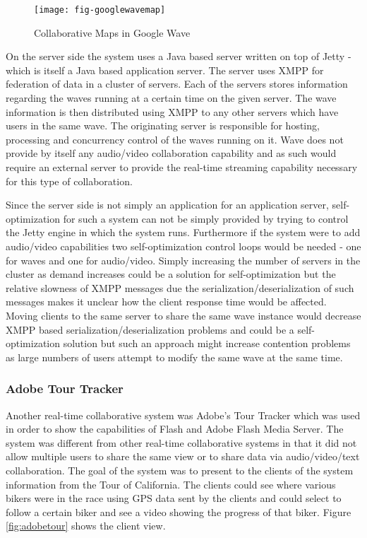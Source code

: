 \begin{figure}
	\centering
	\texttt{[image: fig-googlewavemap]}
	\caption{Collaborative Maps in Google Wave}
	\label{fig:googlewave}
\end{figure}

On the server side the system uses a Java based server written on top of Jetty - which is itself a Java based application server. The server uses XMPP for federation of data in a cluster of servers. Each of the servers stores information regarding the waves running at a certain time on the given server. The wave information is then distributed using XMPP to any other servers which have users in the same wave. The originating server is responsible for hosting, processing and concurrency control of the waves running on it. Wave does not provide by itself any audio/video collaboration capability and as such would require an external server to provide the real-time streaming capability necessary for this type of collaboration.

Since the server side is not simply an application for an application server, self-optimization for such a system can not be simply provided by trying to control the Jetty engine in which the system runs. Furthermore if the system were to add audio/video capabilities two self-optimization control loops would be needed - one for waves and one for audio/video. Simply increasing the number of servers in the cluster as demand increases could be a solution for self-optimization but the relative slowness of XMPP messages due the serialization/deserialization of such messages makes it unclear how the client response time would be affected. Moving clients to the same server to share the same wave instance would decrease XMPP based serialization/deserialization problems and could be a self-optimization solution but such an approach might increase contention problems as large numbers of users attempt to modify the same wave at the same time.

\subsubsection{Adobe Tour Tracker}

Another real-time collaborative system was Adobe's Tour Tracker which was used in order to show the capabilities of Flash and Adobe Flash Media Server. The system was different from other real-time collaborative systems in that it did not allow multiple users to share the same view or to share data via audio/video/text collaboration. The goal of the system was to present to the clients of the system information from the Tour of California. The clients could see where various bikers were in the race using GPS data sent by the clients and could select to follow a certain biker and see a video showing the progress of that biker. Figure \ref{fig:adobetour} shows the client view.


